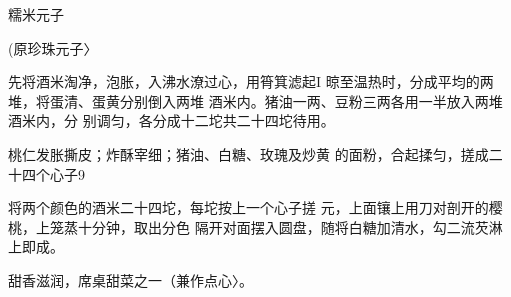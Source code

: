 \begin{recipe}{糯米元子}

(原珍珠元子〉

\ingredients



\cooking

\step 	先将酒米淘净，泡胀，入沸水潦过心，用筲箕滤起I 晾至温热时，分成平均的两堆，将蛋清、蛋黄分别倒入两堆 酒米内。猪油一两、豆粉三两各用一半放入两堆酒米内，分 别调匀，各分成十二坨共二十四坨待用。

\step 	桃仁发胀撕皮；炸酥宰细；猪油、白糖、玫瑰及炒黄 的面粉，合起揉匀，搓成二十四个心子9

\step 	将两个颜色的酒米二十四坨，每坨按上一个心子搓 元，上面镶上用刀对剖开的樱桃，上笼蒸十分钟，取出分色 隔开对面摆入圆盘，随将白糖加清水，勾二流芡淋上即成。

\notes

甜香滋润，席桌甜菜之一（兼作点心〉。

\end{recipe}


